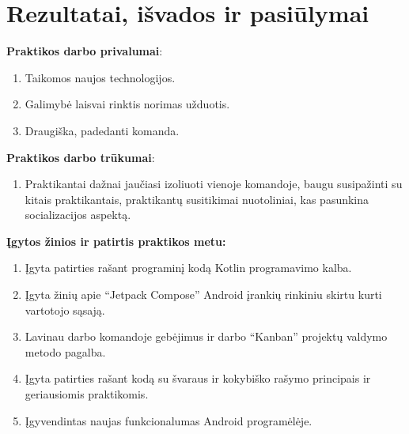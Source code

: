 
\section{Rezultatai, išvados ir pasiūlymai}

\textbf{Praktikos darbo privalumai}:
\begin{enumerate}
    \item Taikomos naujos technologijos.
    \item Galimybė laisvai rinktis norimas užduotis.
    \item Draugiška, padedanti komanda.
\end{enumerate}
\bigskip

\textbf{Praktikos darbo trūkumai}:
\begin{enumerate}
    \item Praktikantai dažnai jaučiasi izoliuoti vienoje komandoje, baugu susipažinti su kitais praktikantais, praktikantų susitikimai nuotoliniai, kas pasunkina socializacijos aspektą.
\end{enumerate}
\bigskip

\textbf{Įgytos žinios ir patirtis praktikos metu:}
\begin{enumerate}
    \item Įgyta patirties rašant programinį kodą Kotlin programavimo kalba.
    \item Įgyta žinių apie “Jetpack Compose” Android įrankių rinkiniu skirtu kurti vartotojo sąsają.
    \item Lavinau darbo komandoje gebėjimus ir darbo \enquote{Kanban} projektų valdymo metodo pagalba.
    \item Įgyta patirties rašant kodą su švaraus ir kokybiško rašymo principais ir geriausiomis praktikomis. 
    \item Įgyvendintas naujas funkcionalumas Android programėlėje.
\end{enumerate}
\bigskip

